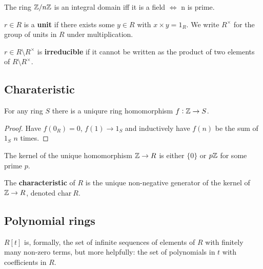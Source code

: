 \documentclass[../Year2.tex]{subfiles}
\begin{document}
\begin{remark}
    The ring $\mathbb{Z}/n\mathbb{Z}$ is an integral domain iff it is a field $\iff$ n is prime.
\end{remark}

\begin{definition}[Unit]
    $r\in R$ is a \textbf{unit} if there exists some $y\in R$ with $x\times y=1_R$. We write  $R^\times$ for the group of units in $R$ under multiplication.
\end{definition}

\begin{definition}[Irreducible]
    $r\in R\setminus R^\times$ is \textbf{irreducible} if it cannot be written as the product of two elements of $R\setminus R^\times$.
\end{definition}

\subsection{Charateristic}

\begin{lemma}
    For any ring $S$ there is a uniqure ring homomorphism $f:\mathbb{Z}\rightarrow S$.
    \begin{proof}
        Have $f(0_R)=0$, $f(1)\rightarrow 1_S$ and inductively have $f(n)$ be the sum of $1_S$ $n$ times.
    \end{proof}
\end{lemma}

\begin{lemma}
    The kernel of the unique homomorphism $\mathbb{Z}\rightarrow R$ is either $\{0\}$ or $p\mathbb{Z}$ for some prime $p$.
\end{lemma}

\begin{definition}[Charateristic]
    The \textbf{characteristic} of $R$ is the unique non-negative generator of the kernel of $\mathbb{Z}\rightarrow R$, denoted $\text{char}\ R$.
\end{definition}

\subsection{Polynomial rings}

\begin{definition}
    $R[t]$ is, formally, the set of infinite sequences of elements of $R$ with finitely many non-zero terms, but more helpfully: the set of polynomials in $t$ with coefficients in $R$.
\end{definition}
\end{document}
